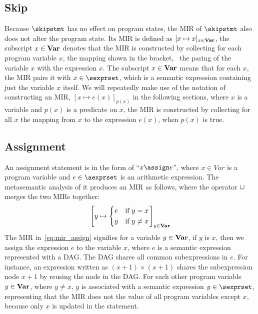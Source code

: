 \subsection{Skip}

Because $\skipstmt$ has no effect on program states, the MIR of $\skipstmt$
also does not alter the program state.  Its MIR is defined as $[x \mapsto
x]_{x \in \mathbf{Var}}$, the subscript $x \in \mathbf{Var}$ denotes that the MIR is
constructed by collecting for each program variable $x$, the mapping shown in
the bracket, \ie~the paring of the variable $x$ with the expression $x$.  The
subscript $x \in \mathbf{Var}$ means that for each $x$, the MIR pairs it with $x \in
\sexprset$, which is a semantic expression containing just the variable $x$
itself.  We will repeatedly make use of the notation of constructing an MIR,
$[x \mapsto e(x)]_{p(x)}$ in the following sections, where $x$ is a variable
and $p(x)$ is a predicate on $x$, the MIR is constructed by collecting for all
$x$ the mapping from $x$ to the expression $e(x)$, when $p(x)$ is true.

\subsection{Assignment}

An assignment statement is in the form of ``$x \assign e$'', where $x \in Var$
is a program variable and $e \in \aexprset$ is an arithmetic expression.  The
metasemantic analysis of it produces an MIR as follows, where the operator
$\sqcup$ merges the two MIRs together:
\begin{equation}
    \left[
        y \mapsto \left\{
            \begin{aligned}
                & e && \text{if~} y = x \\
                & y && \text{if~} y \neq x
            \end{aligned}
        \right.
    \right]_{y \in \mathbf{Var}}
    \label{eq:mir_assign}
\end{equation}
The MIR in~\eqref{eq:mir_assign} signifies for a variable $y \in \mathbf{Var}$,
if $y$ is $x$, then we assign the expression $e$ to the variable $x$, where
$e$ is a semantic expression represented with a DAG\@.  The DAG shares all
common subexpressions in $e$.  For instance, an expression written as $(x + 1)
\times (x + 1)$ shares the subexpression node $x + 1$ by reusing the node in
the DAG\@.  For each other program variable $y \in \mathbf{Var}$, where $y \neq x$,
$y$ is associated with a semantic expression $y \in \sexprset$, representing
that the MIR does not the value of all program variables except $x$, because
only $x$ is updated in the statement.

